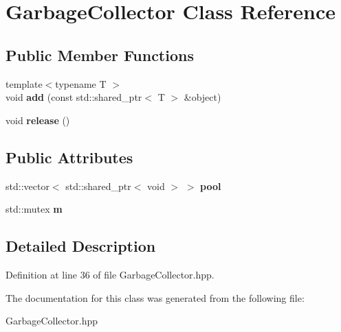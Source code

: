 \hypertarget{classGarbageCollector}{}\section{Garbage\+Collector Class Reference}
\label{classGarbageCollector}
\subsection*{Public Member Functions}
\begin{DoxyCompactItemize}
\item 
\mbox{\label{classGarbageCollector_a714258c044ec11c93dcbce058b11b90e}} 
{\footnotesize template$<$typename T $>$ }\\void {\bfseries add} (const std\+::shared\+\_\+ptr$<$ T $>$ \&object)
\item 
\mbox{\label{classGarbageCollector_aa33d6dfb5b26b3ac9d455918646af44a}} 
void {\bfseries release} ()
\end{DoxyCompactItemize}
\subsection*{Public Attributes}
\begin{DoxyCompactItemize}
\item 
\mbox{\label{classGarbageCollector_adc7048b3a2d2ba24e21b7266dfe4b42e}} 
std\+::vector$<$ std\+::shared\+\_\+ptr$<$ void $>$ $>$ {\bfseries pool}
\item 
\mbox{\label{classGarbageCollector_a43200fd65ff71d251ec8d0c52776ed6a}} 
std\+::mutex {\bfseries m}
\end{DoxyCompactItemize}


\subsection{Detailed Description}


Definition at line 36 of file Garbage\+Collector.\+hpp.



The documentation for this class was generated from the following file\+:\begin{DoxyCompactItemize}
\item 
Garbage\+Collector.\+hpp\end{DoxyCompactItemize}
